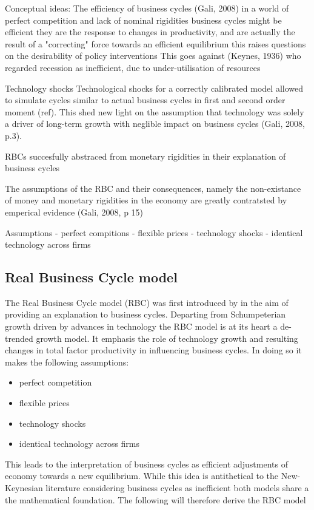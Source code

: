 \documentclass[12pt,a4paper,english]{article} %
\begin{document}
	Conceptual ideas:
	The efficiency of business cycles (Gali, 2008)
	in a world of perfect competition and lack of nominal rigidities business cycles might be efficient
	they are the response to changes in productivity, and are actually the result of a "correcting" force towards an efficient equilibrium
	this raises questions on the desirability of policy interventions
	This goes against (Keynes, 1936) who regarded recession as inefficient, due to under-utilisation of resources
	
	Technology shocks
	Technological shocks for a correctly calibrated model allowed to simulate cycles similar to actual business cycles in first and second order moment (ref). This shed new light on the assumption that technology was solely a driver of long-term growth with neglible impact on business cycles (Gali, 2008, p.3).
	
	RBCs succesfully abstraced from monetary rigidities in their explanation of business cycles
	
	The assumptions of the RBC and their consequences, namely the non-existance of money and monetary rigidities in the economy are greatly contratsted by emperical evidence (Gali, 2008, p 15)
	
	Assumptions
	- perfect compitions
	- flexible prices
	- technology shocks
	- identical technology across firms
	
	
	\subsection{Real Business Cycle model}
	The Real Business Cycle model (RBC) was first introduced by \cite{prescott_theory_1986} in the aim of providing an explanation to business cycles. Departing from Schumpeterian growth driven by advances in technology the RBC model is at its heart a de-trended growth model. It emphasis the role of technology growth and resulting changes in total factor productivity in influencing business cycles. In doing so it makes the following assumptions:
	\begin{itemize}
		\item perfect competition
		\item flexible prices
		\item technology shocks
		\item identical technology across firms
	\end{itemize}
	This leads to the interpretation of business cycles as efficient adjustments of economy towards a new equilibrium. While this idea is antithetical to the New-Keynesian literature considering business cycles as inefficient both models share a the mathematical foundation. The following will therefore derive the RBC model
	
\end{document}

